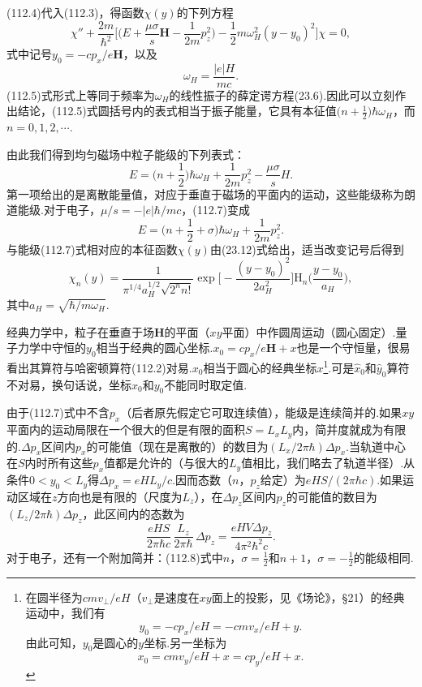 (112.4)代入(112.3)，得函数$\chi(y)$的下列方程
\begin{equation}
  \chi''+\frac{2m}{\hbar^2}\biggl[\biggl(E+\frac{\mu\sigma}{s}\boldsymbol{H}
  -\frac{1}{2m}p_z^2\biggr)-\frac{1}{2}m\omega_H^2(y-y_0)^2\biggr]\chi=0,
\end{equation}
式中记号$y_0=-cp_x/e\boldsymbol{H}$，以及
\begin{equation}
  \omega_H=\frac{|e|H}{mc}.
\end{equation}
(112.5)式形式上等同于频率为$\omega_H$的线性振子的薛定谔方程(23.6).因此可以立刻作出结论，(112.5)式圆括号内的表式相当于振子能量，它具有本征值$\bigl(n+\frac{1}{2}\bigr)\hbar\omega_H$，而$n=0,1,2,\cdots$.

由此我们得到均匀磁场中粒子能级的下列表式：
\begin{equation}
  E=\biggl(n+\frac{1}{2}\biggr)\hbar\omega_H+\frac{1}{2m}p_z^2-\frac{\mu\sigma}{s}H.
\end{equation}
第一项给出的是离散能量值，对应于垂直于磁场的平面内的运动，这些能级称为朗道能级.对于电子，$\mu/s=-|e|\hbar/mc$，(112.7)变成
\begin{equation}
  E=\biggl(n+\frac{1}{2}+\sigma\biggr)\hbar\omega_H+\frac{1}{2m}p_z^2.
\end{equation}
与能级(112.7)式相对应的本征函数$\chi(y)$由(23.12)式给出，适当改变记号后得到
\begin{equation}
  \chi_n(y)=\frac{1}{\pi^{1/4}a_H^{1/2}\sqrt{2^n n!}}
  \exp\biggl[-\frac{(y-y_0)^2}{2a_H^2}\biggr]
  \mathrm{H}_n\biggl(\frac{y-y_0}{a_H}\biggr),
\end{equation}
其中$a_H=\sqrt{\hbar/m\omega_H}$.

经典力学中，粒子在垂直于场$\boldsymbol{H}$的平面（$xy$平面）中作圆周运动（圆心固定）.量子力学中守恒的$y_0$相当于经典的圆心坐标.$x_0=cp_x/e\boldsymbol{H}+x$也是一个守恒量，很易看出其算符与哈密顿算符(112.2)对易.$x_0$相当于圆心的经典坐标$x$\footnote{在圆半径为$cmv_\perp/eH$（$v_\perp$是速度在$xy$面上的投影，见《场论》，§21）的经典运动中，我们有
\begin{equation*}
  y_0=-cp_x/eH=-cmv_x/eH+y.
\end{equation*}
由此可知，$y_0$是圆心的$y$坐标.另一坐标为
\begin{equation*}
  x_0=cmv_y/eH+x=cp_y/eH+x.
\end{equation*}}.可是$\hat{x}_0$和$\hat{y}_0$算符不对易，换句话说，坐标$x_0$和$y_0$不能同时取定值.

由于(112.7)式中不含$p_x$（后者原先假定它可取连续值），能级是连续简并的.如果$xy$平面内的运动局限在一个很大的但是有限的面积$S=L_xL_y$内，简并度就成为有限的.$\Delta p_x$区间内$p_x$的可能值（现在是离散的）的数目为$(L_x/2\pi\hbar)\Delta p_x$.当轨道中心在$S$内时所有这些$p_x$值都是允许的（与很大的$L_y$值相比，我们略去了轨道半径）.从条件$0<y_0<L_y$得$\Delta p_x=eHL_y/c$.因而态数（$n$，$p_z$给定）为$eHS/(2\pi\hbar c)$.如果运动区域在$z$方向也是有限的（尺度为$L_z$），在$\Delta p_z$区间内$p_z$的可能值的数目为$(L_z/2\pi\hbar)\Delta p_z$，此区间内的态数为
\begin{equation}
  \frac{eHS}{2\pi\hbar c}\,\frac{L_z}{2\pi\hbar}\,\Delta p_z
  =\frac{eHV\Delta p_z}{4\pi^2\hbar^2c}.
\end{equation}
对于电子，还有一个附加简并：(112.8)式中$n$，$\sigma=\frac{1}{2}$和$n+1$，$\sigma=-\frac{1}{2}$的能级相同.


